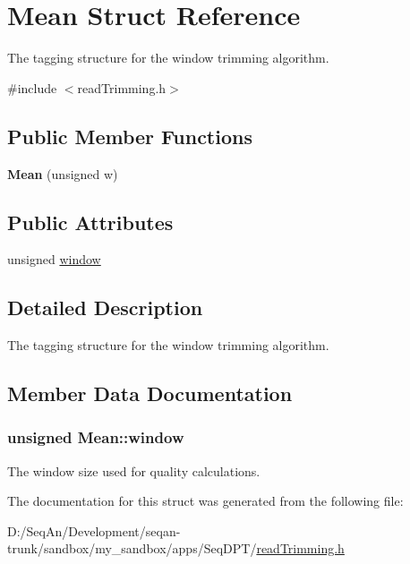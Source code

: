 \hypertarget{struct_mean}{\section{Mean Struct Reference}
\label{struct_mean}
}


The tagging structure for the window trimming algorithm.  




{\ttfamily \#include $<$read\-Trimming.\-h$>$}

\subsection*{Public Member Functions}
\begin{DoxyCompactItemize}
\item 
\hypertarget{struct_mean_a740badd60c7fb746dc2e7456a83ed666}{{\bfseries Mean} (unsigned w)}\label{struct_mean_a740badd60c7fb746dc2e7456a83ed666}

\end{DoxyCompactItemize}
\subsection*{Public Attributes}
\begin{DoxyCompactItemize}
\item 
unsigned \hyperlink{struct_mean_ad9aa4cda35341999d3fba71f94f40be4}{window}
\end{DoxyCompactItemize}


\subsection{Detailed Description}
The tagging structure for the window trimming algorithm. 

\subsection{Member Data Documentation}
\hypertarget{struct_mean_ad9aa4cda35341999d3fba71f94f40be4}{
\subsubsection[{window}]{\setlength{\rightskip}{0pt plus 5cm}unsigned Mean\-::window}}\label{struct_mean_ad9aa4cda35341999d3fba71f94f40be4}
The window size used for quality calculations. 

The documentation for this struct was generated from the following file\-:\begin{DoxyCompactItemize}
\item 
D\-:/\-Seq\-An/\-Development/seqan-\/trunk/sandbox/my\-\_\-sandbox/apps/\-Seq\-D\-P\-T/\hyperlink{read_trimming_8h}{read\-Trimming.\-h}\end{DoxyCompactItemize}
